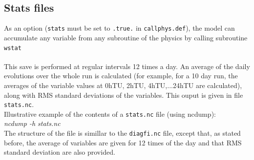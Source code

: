 \subsection{Stats files}

As an option ({\tt stats} must be set to {\tt .true.} in {\tt callphys.def}),
the model can accumulate any
variable from any subroutine of the physics by calling
subroutine \verb+ wstat+
\\ \\
\noindent
This save is performed at regular intervals 12 times a day.
An average of the daily evolutions over the whole run is calculated
(for example, for a 10 day run, the averages of the variable values at
0hTU, 2hTU, 4hTU,...24hTU are calculated), along with RMS standard
deviations of the variables. This ouput is given in
file {\tt stats.nc}.\\


\noindent
Illustrative example of the contents of a {\tt stats.nc} file (using ncdump):\\
\noindent
{\it ncdump -h stats.nc}\\


\noindent
The structure of the file is simillar to the {\tt diagfi.nc} file,
except that, as stated before, the average of variables are given for
12 times of the day and that RMS standard deviation are also provided.


